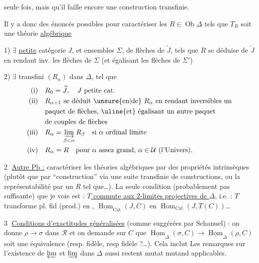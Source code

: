 seule fois, mais qu'il faille encore une construction transfinie.

Il y a donc des énoncés possibles pour caractériser les $R\in\operatorname{Ob}\Delta$ tels que $T_R$ soit une théorie \uline{algébrique}

1) $\exists$ \uline{petite} catégorie $J$, et ensembles $\Sigma$,  de flèches de $\widetilde J$,  tels que $R$ se déduise de $\widetilde J$ en rendant inv. les flèches de $\Sigma$ (et égalisant les  flèches de $\Sigma'$)

2)  $\exists$   transfini $(R_\alpha)$ dans $\Delta$, tel que
\[
 \begin{aligned}
 \text{(i)}\quad &R_0=\widetilde J,\quad J\text{ petite cat.}\\
 \text{(ii)}\quad &R_{\alpha+1}\text{ se déduit \unsure{en|de} $R_\alpha$ en rendant inversibles un}\\
 &\text{paquet de flèches, \uline{et} égalisant un autre paquet}\\
 &\text{de couples de flèches}\\
 \text{(iii)}\quad &R_\alpha=\varinjlim_{\beta<\alpha}R_\beta\quad\text{si $\alpha$ ordinal limite}\\
 \text{(iv)}\quad &R_\alpha=R\quad\text{pour $\alpha$ assez grand, $\alpha\in\mathcal U$ (l'Univers).}
 \end{aligned}
\]

\textcircled{2} \uline{Autre Pb :} caractériser les théories algébriques par des propriétés intrinsèques (plutôt que par ``construction'' via une suite transfinie de constructions, ou la représentabilité par un $R$ tel que\ldots).
La seule condition (probablement pas suffisante) que je voie est : \uline{$T$ commute aux 2-limites projectives de $\Delta$}, i.e. : $T$ transforme   pl. fid (prod.) en , $\underline{\operatorname{Hom}}_{\mathrm{Cat}}(J,C)$ en $\operatorname{Hom}_{\mathrm{Cat}}(J,T(C))$\ldots

\textcircled{3} \uline{Conditions  d'exactitudes généralisées} (comme suggérées par Schanuel) : on donne  $\rho\to\sigma$ dans $\mathcal R$ et on demande sur $C$ que $\underline{\operatorname{Hom}}_\Delta(\sigma,C)\to\underline{\operatorname{Hom}}_\Delta(\rho,C)$ soit une équivalence (resp.  fidèle, resp fidèle ?\ldots). Cela inclut  Les remarques sur l'existence de $\varprojlim$ et $\varinjlim$ dans $\Delta$ aussi restent mutat mutand applicables.
